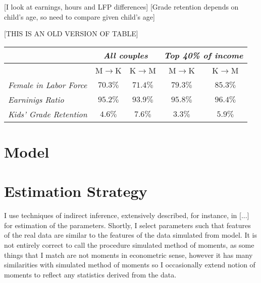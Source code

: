 \documentclass[12pt,letter]{article}
\begin{document}
[I look at earnings, hours and LFP differences] [Grade retention depends on child's age, so need to compare given child's age]

[THIS IS AN OLD VERSION OF TABLE]

\begin{center}
\begin{tabular}{|l||c|c||c|c|}\hline
& \multicolumn{2}{|c||}{\footnotesize \textit{All couples}}  & \multicolumn{2}{|c|}{\footnotesize \textit{Top 40\% of income} } \\\hline
&                       \footnotesize  M$\to$K & \footnotesize  K$\to$M &  \footnotesize  M$\to$K & \footnotesize  K$\to$M \\\hline
\footnotesize \textit{Female in Labor Force}        & $70.3\%$  & $71.4\%$  & $79.3\%$ & $85.3\%$  \\\hline
\footnotesize \textit{Earninigs Ratio}    &  $95.2\%$ & $93.9\%$  &  $95.8\%$ &  $96.4\%$ \\\hline
\footnotesize \textit{Kids' Grade Retention}  & $4.6\%$    & $7.6\%$ &   $3.3\%$   & $5.9\%$ \\\hline
\end{tabular}
\end{center}

\section{Model}



\section{Estimation Strategy}
I use techniques of indirect inference, extensively described, for instance, in [...] for estimation of the parameters. Shortly, I select parameters such that features of the real data are similar to the features of the data simulated from model. It is not entirely correct to call the procedure simulated method of moments, as some things that I match are not moments in econometric sense, however it has many similarities with simulated method of moments so I occasionally extend notion of moments to reflect any statistics derived from the data.
\end{document}

